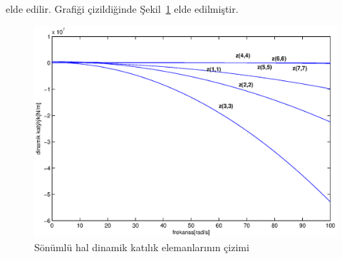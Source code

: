 \documentclass[a4paper]{report}
\begin{document}
elde edilir. Grafiği çizildiğinde Şekil~\ref{fig:dinamikkatiliks} elde edilmiştir.
\begin{figure}[H]
\shorthandoff{=}
\centerline{
{\includegraphics[width=1.3\textwidth]{./dinamikkatiliks.eps}}}
\caption[Dinamik katılık]{Sönümlü hal dinamik katılık elemanlarının çizimi}
\label{fig:dinamikkatiliks}
\end{figure}
\end{document}
